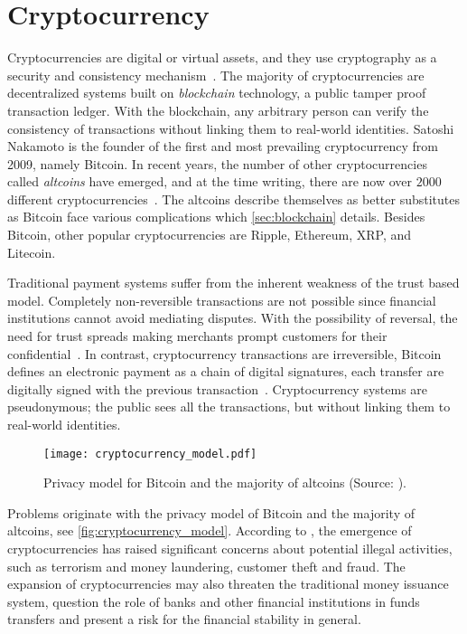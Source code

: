 \section{Cryptocurrency}\label{sec:cryptocurrencies}
Cryptocurrencies are digital or virtual assets, and they use cryptography as a security and consistency mechanism~\cite{investopedia_cryptocurrency, P&D_to_the_moon}. The majority of cryptocurrencies are decentralized systems built on \emph{blockchain} technology, a public tamper proof transaction ledger. With the blockchain, any arbitrary person can verify the consistency of transactions without linking them to real-world identities. Satoshi Nakamoto is the founder of the first and most prevailing cryptocurrency from 2009, namely Bitcoin. In recent years, the number of other cryptocurrencies called \emph{altcoins} have emerged, and at the time writing, there are now over $2000$ different cryptocurrencies~\cite{coinmarketcap}. The altcoins describe themselves as better substitutes as Bitcoin face various complications which \autoref{sec:blockchain} details. Besides Bitcoin, other popular cryptocurrencies are Ripple, Ethereum, XRP, and Litecoin.

Traditional payment systems suffer from the inherent weakness of the trust based model. Completely non-reversible 
transactions are not possible since financial institutions cannot avoid mediating disputes. With the possibility of reversal, the need for trust spreads making merchants prompt customers for their confidential~\cite{bitcoin}. In contrast, cryptocurrency transactions are irreversible, Bitcoin defines an electronic payment as a chain of digital signatures, each transfer are digitally signed with the previous transaction~\cite{bitcoin, ethereum_white}. Cryptocurrency systems are pseudonymous; the public sees all the transactions, but without linking them to real-world identities.

\begin{figure}[ht]
    \texttt{[image: cryptocurrency\_model.pdf]}
    \caption{Privacy model for Bitcoin and the majority of altcoins (Source: \cite{bitcoin}).}
    \label{fig:cryptocurrency_model}
\end{figure}

Problems originate with the privacy model of Bitcoin and the majority of altcoins, see \autoref{fig:cryptocurrency_model}. According to \cite{bitcoin_regulation}, the emergence of cryptocurrencies has raised significant concerns about potential illegal activities, such as terrorism and money laundering, customer theft and fraud. The expansion of cryptocurrencies may also threaten the traditional money issuance system, question the role of banks and other financial institutions in funds transfers and present a risk for the financial stability in general.

